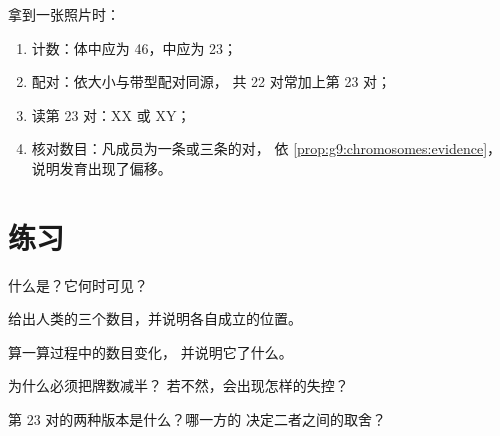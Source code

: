 \begin{method}[读懂核型图]\label{met:g9:chromosomes:read}
拿到一张照片时：
\begin{enumerate}
  \item 计数：体中应为 46，中应为
        23；
  \item 配对：依大小与带型配对同源，
        共 22 对常加上第 23 对；
  \item 读第 23 对：XX 或 XY；
  \item 核对数目：凡成员为一条或三条的对，
        依
        \cref{prop:g9:chromosomes:evidence}，
        说明发育出现了偏移。
\end{enumerate}
\end{method}

\section{练习}

\begin{exercise}[$\star$]\label{exo:g9:chromosomes:1}
什么是？它何时可见？
\end{exercise}

\begin{exercise}[$\star$]\label{exo:g9:chromosomes:2}
给出人类的三个数目，并说明各自成立的位置。
\end{exercise}

\begin{exercise}[$\star$]\label{exo:g9:chromosomes:3}
算一算过程中的数目变化，
并说明它了什么。
\end{exercise}

\begin{exercise}[$\star$]\label{exo:g9:chromosomes:4}
为什么必须把牌数减半？
若不然，会出现怎样的失控？
\end{exercise}

\begin{exercise}[$\star$]\label{exo:g9:chromosomes:5}
第 23 对的两种版本是什么？哪一方的
决定二者之间的取舍？
\end{exercise}

